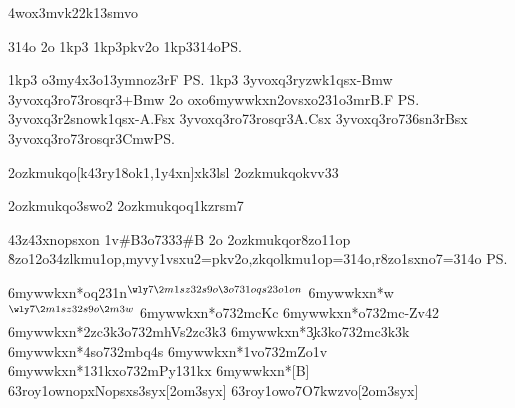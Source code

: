 \nym4wox3mvk22{k13smvo}

\spWW\WW314o
\WWpkv2o
\spn1kp3
\n1kp3pkv2o \spWW\n1kp3314o\ps

\spn1kp3  %
\2o3my4x3o1{3ymnoz3r}{F}
\ps
%
\spn1kp3
 \knn3yvoxq3r{\3yzwk1qsx}{-Bmw}
 \knn3yvoxq3r{\3o73rosqr3}{+Bmw}
\ov2o%
 \1oxo6mywwkxn{\lk2ovsxo231o3mr}{B.F}
\ps
\knn3yvoxq3r{\ynn2snowk1qsx}{-A.Fsx}
\knn3yvoxq3r{\3o73rosqr3}{A.Csx}
\knn3yvoxq3r{\3o736sn3r}{Bsx}
\spWW\knn3yvoxq3r{\3o73rosqr3}{Cmw}\ps

\42ozkmukqo[k43ry18ok1,1y4xn]{xk3lsl}
\42ozkmukqo{kvv33}

\42ozkmukqo{3swo2}
\42ozkmukqo{q1kzrsm7}

\znpy43z43\4xnopsxon
  \nop\41v#B{\23o7333{#B}} %
\ov2o
  \42ozkmukqo{r8zo11op}
  \r8zo12o34z{lkmu1op,myvy1vsxu2=pkv2o,zkqolkmu1op=314o,r8zo1sxno7=314o}
\ps

\xo6mywwkxn*{\1oq231n}{$^{\wly7{\2m1sz32s9o{\3o731oqs23o1on}}}$}
\xo6mywwkxn*{\3w}{$^{\wly7{\2m1sz32s9o\2m 3w}}$}
\xo6mywwkxn*{\cKc}{\3o732m{cKc}}
\xo6mywwkxn*{}{\3o732m{c-Zv42}}
\xo6mywwkxn*{\hVs2zc3k3}{\3o732m{hVs2zc3k3}}
\xo6mywwkxn*{\c3k3k}{\3o732m{c3k3k}}
\xo6mywwkxn*{\bq4s}{\3o732m{bq4s}}
\xo6mywwkxn*{\Zo1v}{\3o732m{Zo1v}}
\xo6mywwkxn*{\Py131kx}{\3o732m{Py131kx}}
\xo6mywwkxn*{}[B]{}
\xo63roy1ow{nopx}{Nopsxs3syx}[2om3syx]
\xo63roy1ow{o7}{O7kwzvo}[2om3syx]

